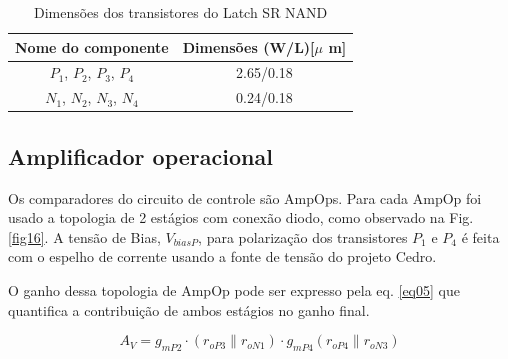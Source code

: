 \begin{table}[htb]
\centering
\begin{tabular}{c|c}
\hline 
\hline 
\textbf{Nome do componente} & \textbf{Dimensões (W/L)[$\mu$ m]} \\ 
\hline 
\hline 
$P_1$, $P_2$, $P_3$, $P_4$ 	& 2.65/0.18 \\ \hline 
$N_1$, $N_2$, $N_3$, $N_4$  & 0.24/0.18 \\ 
\hline 
\end{tabular} 
\caption{Dimensões dos transistores do Latch SR NAND}
\label{tab:latch}
\end{table}

\newpage

\subsection{Amplificador operacional}

Os comparadores do circuito de controle são AmpOps. Para cada AmpOp foi usado a topologia de 2 estágios com conexão diodo, como observado na Fig.\ref{fig16}. A tensão de Bias, $V_{biasP}$, para polarização dos transistores $P_1$ e $P_4$ é feita com o espelho de corrente usando a fonte de tensão do projeto Cedro.

O ganho dessa topologia de AmpOp pode ser expresso pela eq. \ref{eq05} que quantifica a contribuição de ambos estágios no ganho final.


\begin{equation}
 A_V = g_{mP2}\cdot(r_{oP3}\parallel r_{oN1})\cdot g_{mP4}(r_{oP4}\parallel r_{oN3})
 \label{eq05}
\end{equation}

